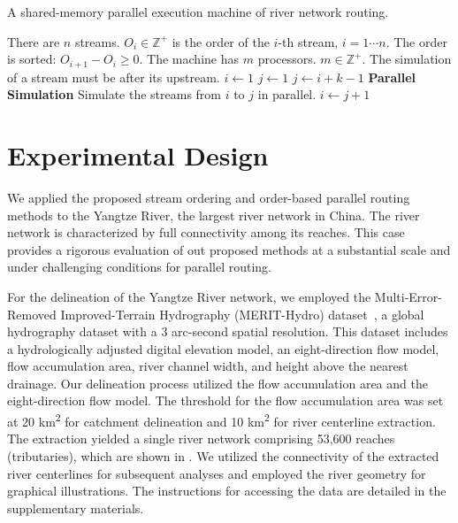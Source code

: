 \documentclass[water,article,submit,pdftex,moreauthors]{Definitions/mdpi}
\begin{document}
\begin{algorithm}
    \caption{A shared-memory parallel execution machine of river network routing.}
    \label{alg:shared_memory}
    \begin{algorithmic}
        \REQUIRE There are $n$ streams. $O_i \in \mathbb{Z}^{+}$ is the order of the $i$-th stream, $i = 1\cdots{}n$. The order is sorted: $O_{i+1} - O_i \ge 0$.
        \REQUIRE The machine has $m$ processors. $m \in \mathbb{Z}^{+}$.
        \ENSURE The simulation of a stream must be after its upstream.
        \STATE $i \gets 1$ 
        \STATE $j \gets 1$ 
        \STATE $j \gets i + k - 1$
        \ENDIF
        \ENDFOR
        \STATE \textbf{Parallel Simulation} Simulate the streams from $i$ to $j$ in parallel.
        \STATE $i \gets j + 1$
        \ENDWHILE
    \end{algorithmic}
\end{algorithm}

\section{Experimental Design}
\label{sec:domain}

We applied the proposed stream ordering and order-based parallel routing methods to the Yangtze River, the largest river network in China. The river network is characterized by full connectivity among its reaches. This case provides a rigorous evaluation of out proposed methods at a substantial scale and under challenging conditions for parallel routing.

For the delineation of the Yangtze River network, we employed the Multi-Error-Removed Improved-Terrain Hydrography (MERIT-Hydro) dataset~\cite{yamazaki2017GRL, yamazaki2019WRR}, a global hydrography dataset with a 3 arc-second spatial resolution. This dataset includes a hydrologically adjusted digital elevation model, an eight-direction flow model, flow accumulation area, river channel width, and height above the nearest drainage. Our delineation process utilized the flow accumulation area and the eight-direction flow model. The threshold for the flow accumulation area was set at 20 km\textsuperscript{2} for catchment delineation and 10 km\textsuperscript{2} for river centerline extraction. The extraction yielded a single river network comprising 53,600 reaches (tributaries), which are shown in . We utilized the connectivity of the extracted river centerlines for subsequent analyses and employed the river geometry for graphical illustrations. The instructions for accessing the data are detailed in the supplementary materials.
\end{document}
